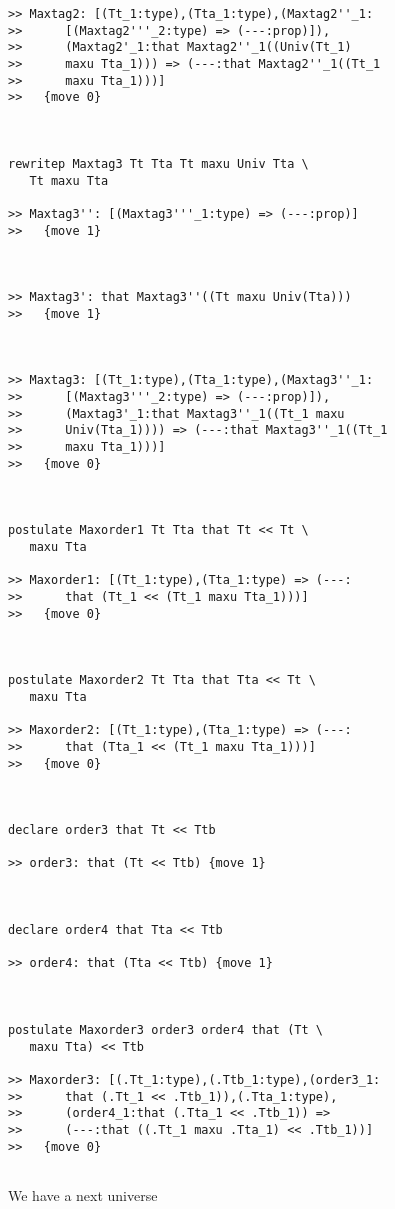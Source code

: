\documentclass{article}
\begin{document}
\begin{verbatim}
>> Maxtag2: [(Tt_1:type),(Tta_1:type),(Maxtag2''_1:
>>      [(Maxtag2'''_2:type) => (---:prop)]),
>>      (Maxtag2'_1:that Maxtag2''_1((Univ(Tt_1)
>>      maxu Tta_1))) => (---:that Maxtag2''_1((Tt_1
>>      maxu Tta_1)))]
>>   {move 0}



rewritep Maxtag3 Tt Tta Tt maxu Univ Tta \
   Tt maxu Tta

>> Maxtag3'': [(Maxtag3'''_1:type) => (---:prop)]
>>   {move 1}



>> Maxtag3': that Maxtag3''((Tt maxu Univ(Tta)))
>>   {move 1}



>> Maxtag3: [(Tt_1:type),(Tta_1:type),(Maxtag3''_1:
>>      [(Maxtag3'''_2:type) => (---:prop)]),
>>      (Maxtag3'_1:that Maxtag3''_1((Tt_1 maxu
>>      Univ(Tta_1)))) => (---:that Maxtag3''_1((Tt_1
>>      maxu Tta_1)))]
>>   {move 0}



postulate Maxorder1 Tt Tta that Tt << Tt \
   maxu Tta

>> Maxorder1: [(Tt_1:type),(Tta_1:type) => (---:
>>      that (Tt_1 << (Tt_1 maxu Tta_1)))]
>>   {move 0}



postulate Maxorder2 Tt Tta that Tta << Tt \
   maxu Tta

>> Maxorder2: [(Tt_1:type),(Tta_1:type) => (---:
>>      that (Tta_1 << (Tt_1 maxu Tta_1)))]
>>   {move 0}



declare order3 that Tt << Ttb

>> order3: that (Tt << Ttb) {move 1}



declare order4 that Tta << Ttb

>> order4: that (Tta << Ttb) {move 1}



postulate Maxorder3 order3 order4 that (Tt \
   maxu Tta) << Ttb

>> Maxorder3: [(.Tt_1:type),(.Ttb_1:type),(order3_1:
>>      that (.Tt_1 << .Ttb_1)),(.Tta_1:type),
>>      (order4_1:that (.Tta_1 << .Ttb_1)) =>
>>      (---:that ((.Tt_1 maxu .Tta_1) << .Ttb_1))]
>>   {move 0}


\end{verbatim}

We have a next universe
\end{document}
